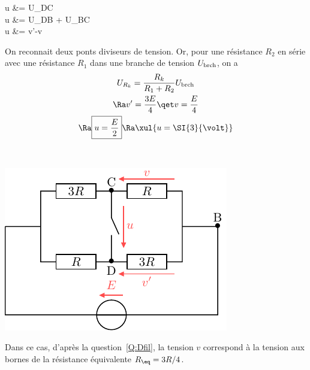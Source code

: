 \documentclass[a4paper, 10pt, garamond, oneside]{book}
\begin{document}
{\begin{enumerate}
		 \noindent
		\begin{minipage}[t]{0.55\linewidth}
			\begin{DispWithArrows*}
				u &= U_{DC}
				\\\Lra
				u &= U_{DB} + U_{BC}
				\\\Lra
				u &= v'-v
			\end{DispWithArrows*}
			On reconnait deux ponts diviseurs de tension. Or, pour une
			résistance $R_2$ en série avec une résistance $R_1$ dans une branche
			de tension $U_{\rm brch}$, on a
			\begin{gather*}
				U_{R_k} = \frac{R_k}{R_1+R_2}U_{\rm brch}
				\\\Ra
				v'=\frac{3E}{4}
				\qet
				v=\frac{E}{4}
				\\\Ra
				\boxed{u=\frac{E}{2}}
				\Ra
				\xul{u=\SI{3}{\volt}}
			\end{gather*}
		\end{minipage}
		\hfill
		\begin{minipage}[t]{0.4\linewidth}
			~
			\vspace{-40pt}
			\begin{center}
				\includegraphics[width=\linewidth]{diplin_q3}
			\end{center}
		\end{minipage}
		\noindent
		\begin{minipage}[t]{0.55\linewidth}
			Dans ce cas, d'après la question~\ref{Q:Dfil}, la tension $v$
			correspond à la tension aux bornes de la résistance équivalente
			$R_{\eq} = 3R/4$.


\end{minipage}
\end{enumerate}}
\end{document}
